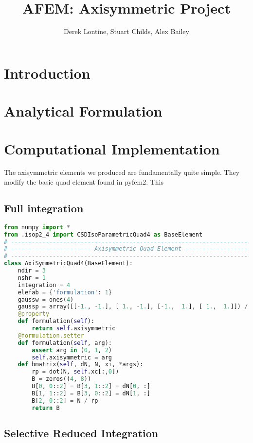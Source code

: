 \documentclass[10pt,letterpaper]{report}
\author{Derek Lontine, Stuart Childs, Alex Bailey}
\title{AFEM: Axisymmetric Project}
\numberwithin{equation}{chapter}
\begin{document}
\maketitle
\chapter{Introduction}

\chapter{Analytical Formulation}

\chapter{Computational Implementation}
The axisymmetric elements we produced are fundamentally quite simple. They modify the basic quad element found in pyfem2. This 
\section{Full integration}

\begin{lstlisting}[language=python]
from numpy import *
from .isop2_4 import CSDIsoParametricQuad4 as BaseElement
# --------------------------------------------------------------------------- #
# ----------------------- Axisymmetric Quad Element ------------------------- #
# --------------------------------------------------------------------------- #
class AxiSymmetricQuad4(BaseElement):
    ndir = 3
    nshr = 1
    integration = 4
    elefab = {'formulation': 1}
    gaussw = ones(4)
    gaussp = array([[-1., -1.], [ 1., -1.], [-1.,  1.], [ 1.,  1.]]) / sqrt(3.)
    @property
    def formulation(self):
        return self.axisymmetric
    @formulation.setter
    def formulation(self, arg):
        assert arg in (0, 1, 2)
        self.axisymmetric = arg
    def bmatrix(self, dN, N, xi, *args):
        rp = dot(N, self.xc[:,0])
        B = zeros((4, 8))
        B[0, 0::2] = B[3, 1::2] = dN[0, :]
        B[1, 1::2] = B[3, 0::2] = dN[1, :]
        B[2, 0::2] = N / rp
        return B

\end{lstlisting}


\section{Selective Reduced Integration}
\end{document}
